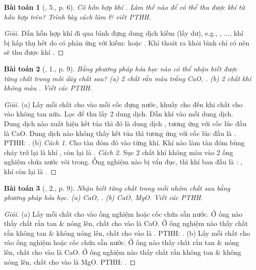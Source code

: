 \documentclass{article}
\newtheorem{baitoan}{Bài toán}
\begin{document}
\begin{baitoan}[\cite{SGK_Hoa_Hoc_9}, 5., p. 6]
	Có hỗn hợp khí \emph{}. Làm thế nào để có thể thu được khí \emph{} từ hỗn hợp trên? Trình bày cách làm \& viết PTHH.
\end{baitoan}

\begin{proof}[Giải]
	Dẫn hỗn hợp khí  đi qua bình đựng dung dịch kiềm (lấy dư), e.g., , $\ldots$, khí  bị hấp thụ hết do có phản ứng với kiềm:  hoặc . Khí thoát ra khỏi bình chỉ có  nên sẽ thu được khí .
\end{proof}

\begin{baitoan}[\cite{SGK_Hoa_Hoc_9}, 1., p. 9]
	Bằng phương pháp hóa học nào có thể nhận biết được từng chất trong mỗi dãy chất sau? (a) 2 chất rắn màu trắng \emph{CaO, }. (b) 2 chất khí không màu \emph{}. Viết các PTHH.
\end{baitoan}

\begin{proof}[Giải]
	(a) Lấy mỗi chất cho vào mỗi cốc đựng nước, khuấy cho đến khi chất cho vào không tan nữa. Lọc để thu lấy 2 dung dịch. Dẫn khí  vào mỗi dung dịch. Dung dịch nào xuất hiện kết tủa thì đó là dung dịch , tương ứng với cốc lúc đầu là CaO. Dung dịch nào không thấy kết tủa thì tương ứng với cốc lúc đầu là . PTHH: . (b) \textit{Cách 1.} Cho tàn đóm đỏ vào từng khí. Khí nào làm tàn đóm bùng cháy trở lại là khí , còn lại là . \textit{Cách 2.} Sục 2 chất khí không màu vào 2 ống nghiệm chứa nước vôi  trong. Ống nghiệm nào bị vẩn đục, thì khí ban đầu là : , khí còn lại là .
\end{proof}

\begin{baitoan}[\cite{SGK_Hoa_Hoc_9}, 2., p. 9]
	Nhận biết từng chất trong mỗi nhóm chất sau bằng phương pháp hóa học. (a) \emph{CaO, }. (b) \emph{CaO, MgO}. Viết các PTHH.
\end{baitoan}

\begin{proof}[Giải]
	(a) Lấy mỗi chất cho vào ống nghiệm hoặc cốc chứa sẵn nước. Ở ống nào thấy chất rắn tan \& nóng lên, chất cho vào là CaO. Ở ống nghiệm nào thấy chất rắn không tan \& không nóng lên, chất cho vào là . PTHH: . (b) Lấy mỗi chất cho vào ống nghiệm hoặc cốc chứa sẵn nước. Ở ống nào thấy chất rắn tan \& nóng lên, chất cho vào là CaO. Ở ống nghiệm nào thấy chất rắn không tan \& không nóng lên, chất cho vào là MgO. PTHH: .
\end{proof}
\end{document}
